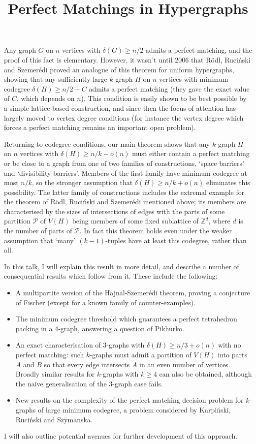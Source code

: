 \title{Perfect Matchings in Hypergraphs}
\endtitle
Any graph $G$ on $n$ vertices with $\delta(G) \geq n/2$ admits a perfect
matching, and the proof of this fact is elementary. However, it wasn't
until 2006 that R\"odl, Ruci\'nski and Szemer\'edi proved an analogue of
this theorem for uniform hypergraphs, showing that any sufficiently
large $k$-graph $H$ on $n$ vertices with minimum codegree $\delta(H)
\geq n/2 - C$ admits a perfect matching (they gave the exact value of
$C$, which depends on $n$). This condition is easily shown to be best
possible by a simple lattice-based construction, and since then the
focus of attention has largely moved to vertex degree conditions (for
instance the vertex degree which forces a perfect matching remains an
important open problem).

Returning to codegree conditions, our main theorem shows that any
$k$-graph $H$ on $n$ vertices with $\delta(H) \geq n/k-o(n)$ must either
contain a perfect matching or be close to a graph from one of two
families of constructions, `space barriers' and `divisibility barriers'.
Members of the first family have minimum codegree at most $n/k$, so the
stronger assumption that $\delta(H) \geq n/k +o(n)$ eliminates this
possibility. The latter family of constructions includes the extremal
example for the theorem of R\"odl, Ruci\'nski and Szemer\'edi mentioned
above; its members are characterised by the sizes of intersections of
edges with the parts of some partition $\mathcal{P}$ of $V(H)$ being
members of some fixed sublattice of $\mathbb{Z}^d$, where $d$ is the
number of parts of $\mathcal{P}$. In fact this theorem holds even under
the weaker assumption that `many' $(k-1)$-tuples have at least this
codegree, rather than all.

In this talk, I will explain this result in more detail, and describe a
number of consequential results which follow from it. These include the
following:
\begin{itemize}
\item A multipartite version of the Hajnal-Szemer\'edi theorem, proving
a conjecture of Fischer (except for a known family of counter-examples).
\item The minimum codegree threshold which guarantees a perfect
tetrahedron packing in a 4-graph, answering a question of Pikhurko.
\item An exact characterisation of 3-graphs with $\delta(H) \geq n/3 +
o(n)$ with no perfect matching: such $k$-graphs must admit a partition
of $V(H)$ into parts $A$ and $B$ so that every edge intersects $A$ in an
even number of vertices. Broadly similar results for $k$-graphs with $k
\geq 4$ can also be obtained, although the naive generalisation of the
3-graph case fails.
\item New results on the complexity of the perfect matching decision
problem for $k$-graphs of large minimum codegree, a problem considered
by Karpi\'nski, Ruci\'nski and Szymanska.
\end{itemize}
I will also outline potential avenues for further development of this
approach.